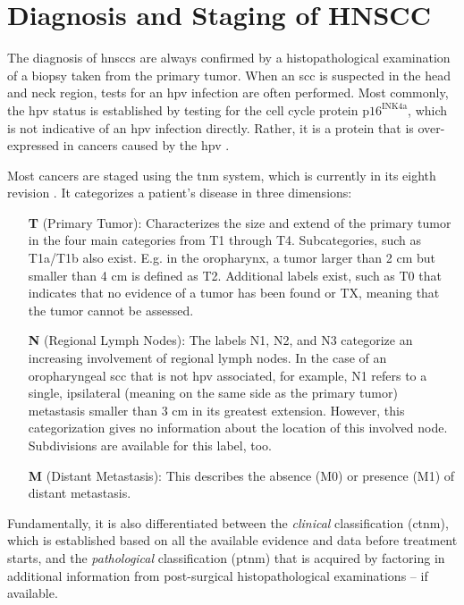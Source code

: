 \documentclass[\relativeRoot/main.tex]{subfiles}
\begin{document}
\section{Diagnosis and Staging of HNSCC}
\label{sec:intro:diagnosis}

The diagnosis of \glspl{hnscc} are always confirmed by a histopathological examination of a biopsy taken from the primary tumor. When an \gls{scc} is suspected in the head and neck region, tests for an \gls{hpv} infection are often performed. Most commonly, the \gls{hpv} status is established by testing for the cell cycle protein $\text{p16}^\text{INK4a}$, which is not indicative of an \gls{hpv} infection directly. Rather, it is a protein that is over-expressed in cancers caused by the \acrlong{hpv} \cite{johnson_head_2020}.

Most cancers are staged using the \gls{tnm} system, which is currently in its eighth revision \cite{brierley_tnm_2017}. It categorizes a patient's disease in three dimensions:

\begin{enumerate}
    \item[\textbf{T}] (Primary Tumor): Characterizes the size and extend of the primary tumor in the four main categories from T1 through T4. Subcategories, such as T1a/T1b also exist. E.g. in the oropharynx, a tumor larger than 2 cm but smaller than 4 cm is defined as T2. Additional labels exist, such as T0 that indicates that no evidence of a tumor has been found or TX, meaning that the tumor cannot be assessed.
    \item[\textbf{N}] (Regional Lymph Nodes): The labels N1, N2, and N3 categorize an increasing involvement of regional lymph nodes. In the case of an oropharyngeal \gls{scc} that is not \gls{hpv} associated, for example, N1 refers to a single, ipsilateral (meaning on the same side as the primary tumor) metastasis smaller than 3 cm in its greatest extension. However, this categorization gives no information about the location of this involved node. Subdivisions are available for this label, too.
    \item[\textbf{M}] (Distant Metastasis): This describes the absence (M0) or presence (M1) of distant metastasis.
\end{enumerate}

Fundamentally, it is also differentiated between the \emph{clinical} classification (c\gls{tnm}), which is established based on all the available evidence and data before treatment starts, and the \emph{pathological} classification (p\gls{tnm}) that is acquired by factoring in additional information from post-surgical histopathological examinations -- if available.
\end{document}

